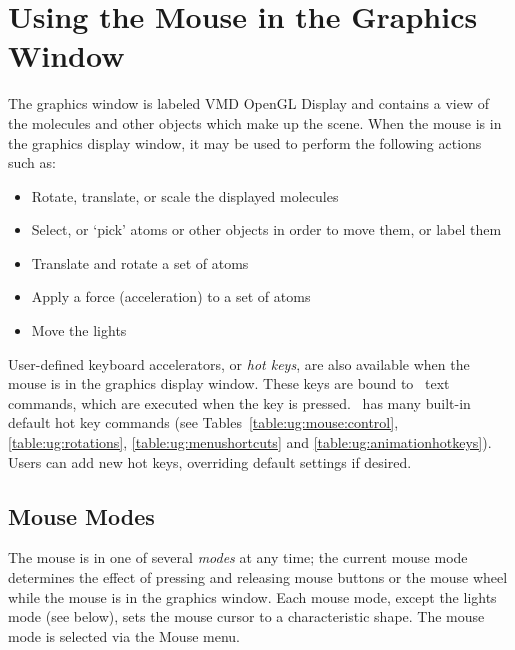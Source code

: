 %
%
%

\section{Using the Mouse in the Graphics Window}
\label{ug:ui:disp}

The graphics window is labeled {\sf VMD OpenGL Display} and contains a
view of the molecules and other objects which make up the scene.  
When the mouse is in the graphics display window, it may be used to perform 
the following actions such as:
\begin{itemize}
  \item Rotate, translate, or scale the displayed molecules
  \item Select, or `pick' atoms or other objects in order to 
        move them, or label them 
  \item Translate and rotate a set of atoms
  \item Apply a force (acceleration) to a set of atoms
  \item Move the lights
\end{itemize}
User-defined keyboard accelerators, or {\em hot keys}, are also available
when the mouse is in the graphics display window.  
These keys are bound to \VMD\ text commands, which are executed when the key
is pressed.  \VMD\ has many built-in default hot key commands (see 
Tables~\ref{table:ug:mouse:control}, \ref{table:ug:rotations},
\ref{table:ug:menushortcuts} and \ref{table:ug:animationhotkeys}). 
Users can add new hot keys, overriding default settings if desired.  


\subsection{Mouse Modes }
\label{ug:ui:disp:modes}

The mouse is in one of several {\em modes} at any time; 
the current mouse mode determines the effect of pressing
and releasing mouse buttons or the mouse wheel while the mouse
is in the graphics window.
Each mouse mode, except the lights mode (see below), 
sets the mouse cursor to a characteristic shape.  
The mouse mode is selected via the Mouse menu.


